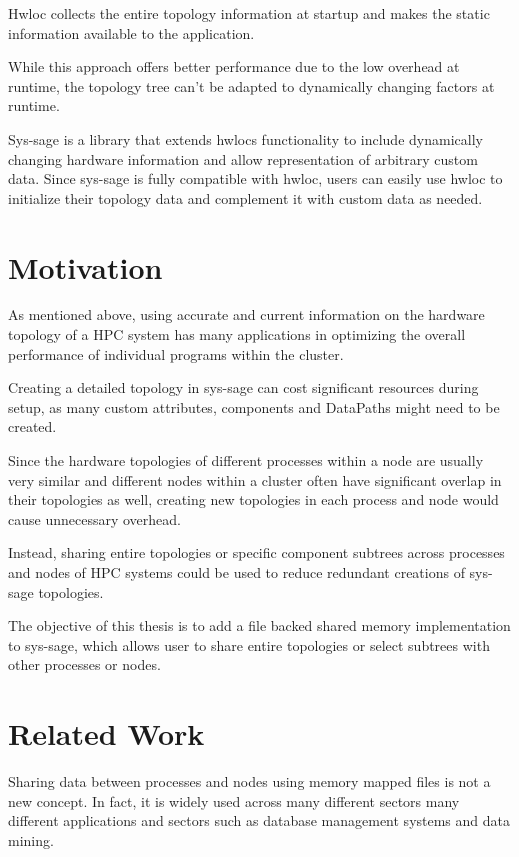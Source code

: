 Hwloc collects the entire topology information at startup and makes the static information available to the application. \cite{hwloc_paper}

While this approach offers better performance due to the low overhead at runtime, the topology tree can't be adapted to dynamically changing factors at runtime.

Sys-sage \cite{sys-sage} is a library that extends hwlocs functionality to include dynamically changing hardware information and allow representation of arbitrary custom data.
Since sys-sage is fully compatible with hwloc, users can easily use hwloc to initialize their topology data and complement it with custom data as needed.

\section{Motivation}
As mentioned above, using accurate and current information on the hardware topology of a HPC system
has many applications in optimizing the overall performance of individual programs within the cluster.

Creating a detailed topology in sys-sage can cost significant resources during setup, as many custom attributes, components and DataPaths might need to be created.

Since the hardware topologies of different processes within a node are usually very similar
and different nodes within a cluster often have significant overlap in their topologies as well, creating new topologies in each process and node would cause unnecessary overhead.

Instead, sharing entire topologies or specific component subtrees across processes and nodes of HPC systems could be used to reduce redundant creations of sys-sage topologies.

The objective of this thesis is to add a file backed shared memory implementation to sys-sage, which allows user to share entire topologies or select subtrees with other processes or nodes.

\section{Related Work}
Sharing data between processes and nodes using memory mapped files is not a new concept. In fact, it is widely used across many different sectors many different applications and sectors such as
database management systems and data mining. \cite{crotty22-mmap} \cite{mmap_related_work}

